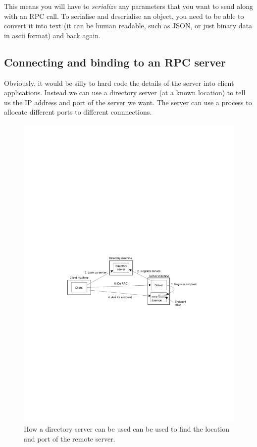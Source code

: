 This means you will have to \textit{serialize} any parameters that you want to
send along with an RPC call. To serialise and deserialise an object, you need to
be able to convert it into text (it can be human readable, such as JSON, or just
binary data in ascii format) and back again.

\subsection{Connecting and binding to an RPC server}

Obviously, it would be silly to hard code the details of the server into client
applications. Instead we can use a directory server (at a known location) to
tell us the IP address and port of the server we want. The server can use a
process to allocate different ports to different connnections.

\begin{figure}[H]
  \centering
  \includegraphics[width=\textwidth]{images/directory-server}
  \caption{How a directory server can be used can be used to find the location
  and port of the remote server.}
  \label{rpc-stub}
\end{figure}

